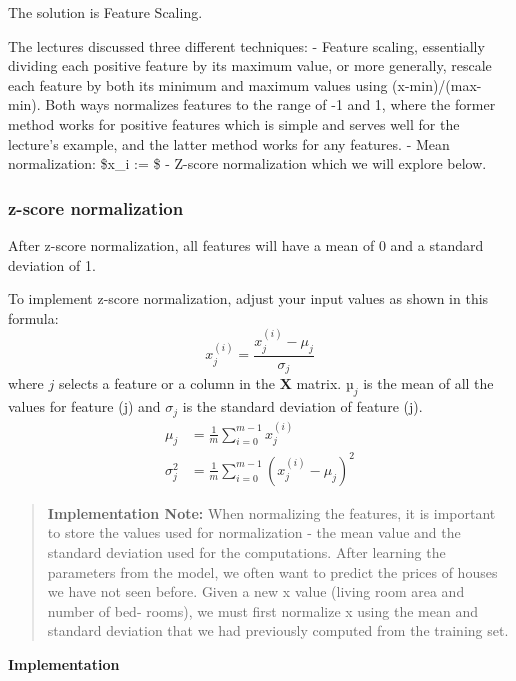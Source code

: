 \documentclass[11pt]{article}
\begin{document}
The solution is Feature Scaling.

    The lectures discussed three different techniques: - Feature scaling,
essentially dividing each positive feature by its maximum value, or more
generally, rescale each feature by both its minimum and maximum values
using (x-min)/(max-min). Both ways normalizes features to the range of
-1 and 1, where the former method works for positive features which is
simple and serves well for the lecture's example, and the latter method
works for any features. - Mean normalization: \$x\_i :=
 \$ - Z-score normalization which we will
explore below.

    \hypertarget{z-score-normalization}{%
\subsubsection{z-score normalization}\label{z-score-normalization}}

After z-score normalization, all features will have a mean of 0 and a
standard deviation of 1.

To implement z-score normalization, adjust your input values as shown in
this formula:
\[x^{(i)}_j = \dfrac{x^{(i)}_j - \mu_j}{\sigma_j} \tag{4}\] where \(j\)
selects a feature or a column in the \(\mathbf{X}\) matrix. \(µ_j\) is
the mean of all the values for feature (j) and \(\sigma_j\) is the
standard deviation of feature (j). \[
\begin{align}
\mu_j &= \frac{1}{m} \sum_{i=0}^{m-1} x^{(i)}_j \tag{5}\\
\sigma^2_j &= \frac{1}{m} \sum_{i=0}^{m-1} (x^{(i)}_j - \mu_j)^2  \tag{6}
\end{align}
\]

\begin{quote}
\textbf{Implementation Note:} When normalizing the features, it is
important to store the values used for normalization - the mean value
and the standard deviation used for the computations. After learning the
parameters from the model, we often want to predict the prices of houses
we have not seen before. Given a new x value (living room area and
number of bed- rooms), we must first normalize x using the mean and
standard deviation that we had previously computed from the training
set.
\end{quote}

\textbf{Implementation}
\end{document}
